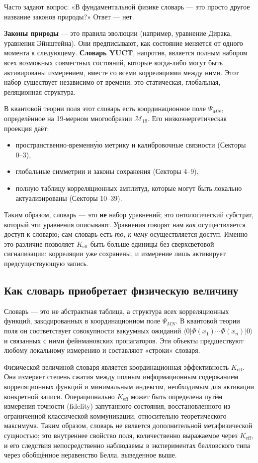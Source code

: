 \documentclass[12pt,a4paper]{article}
\theoremstyle{remark}
\begin{document}
Часто задают вопрос: «В фундаментальной физике словарь — это просто другое название законов природы?» Ответ — нет.

\textbf{Законы природы} — это правила эволюции (например, уравнение Дирака, уравнения Эйнштейна). Они предписывают, как состояние меняется от одного момента к следующему. \textbf{Словарь YUCT}, напротив, является полным набором всех возможных совместных состояний, которые когда‑либо могут быть активированы измерением, вместе со всеми корреляциями между ними. Этот набор существует независимо от времени; это статическая, глобальная, реляционная структура.

В квантовой теории поля этот словарь есть координационное поле $\Psi_{MN}$, определённое на 19‑мерном многообразии $\mathcal{M}_{19}$. Его низкоэнергетическая проекция даёт:
\begin{itemize}
	\item пространственно‑временну́ю метрику и калибровочные связности (Секторы 0--3),
	\item глобальные симметрии и законы сохранения (Секторы 4--9),
	\item полную таблицу корреляционных амплитуд, которые могут быть локально актуализированы (Секторы 10--39).
\end{itemize}
Таким образом, словарь — это \textbf{не} набор уравнений; это онтологический субстрат, который эти уравнения описывают. Уравнения говорят нам \emph{как} осуществляется доступ к словарю; сам словарь есть \emph{то, к чему} осуществляется доступ. Именно это различие позволяет $K_{\mathrm{eff}}$ быть больше единицы без сверхсветовой сигнализации: корреляции уже сохранены, и измерение лишь активирует предсуществующую запись.

\subsection*{Как словарь приобретает физическую величину}

Словарь — это не абстрактная таблица, а структура всех корреляционных функций, закодированных в координационном поле $\Psi_{MN}$. В квантовой теории поля он соответствует совокупности вакуумных ожиданий $\langle 0|\Phi(x_1)\cdots\Phi(x_n)|0\rangle$ и связанных с ними фейнмановских пропагаторов. Эти объекты предшествуют любому локальному измерению и составляют «строки» словаря.

Физической величиной словаря является координационная эффективность $K_{\mathrm{eff}}$. Она измеряет степень сжатия между полным информационным содержанием корреляционных функций и минимальным индексом, необходимым для активации конкретной записи. Операционально $K_{\mathrm{eff}}$ может быть определена путём измерения точности (fidelity) запутанного состояния, восстановленного из ограниченной классической коммуникации, относительно теоретического максимума. Таким образом, словарь не является дополнительной метафизической сущностью; это внутреннее свойство поля, количественно выражаемое через $K_{\mathrm{eff}}$, и его следствия непосредственно наблюдаемы в экспериментах белловского типа через обобщённое неравенство Белла, выведенное выше.
\end{document}
